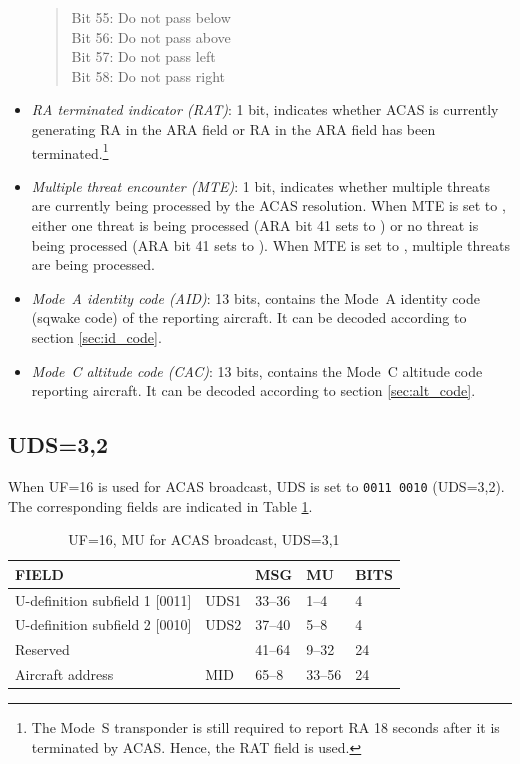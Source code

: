 \begin{itemize}
  \begin{quote}
    \small
    Bit 55: Do not pass below \\
    Bit 56: Do not pass above \\
    Bit 57: Do not pass left \\
    Bit 58: Do not pass right
  \end{quote}


  \item \emph{RA terminated indicator (RAT)}: 1 bit, indicates whether ACAS is currently generating RA in the ARA field or RA in the ARA field has been terminated.\footnote{The Mode~S transponder is still required to report RA 18 seconds after it is terminated by ACAS. Hence, the RAT field is used.}


  \item \emph{Multiple threat encounter (MTE)}: 1 bit, indicates whether multiple threats are currently being processed by the ACAS resolution. When MTE is set to \0, either one threat is being processed (ARA bit 41 sets to \1) or no threat is being processed (ARA bit 41 sets to \0). When MTE is set to \1, multiple threats are being processed.

  \item \emph{Mode~A identity code (AID)}: 13 bits, contains the Mode~A identity code (sqwake code) of the reporting aircraft. It can be decoded according to section \ref{sec:id_code}.

  \item \emph{Mode~C altitude code (CAC)}: 13 bits, contains the Mode~C altitude code reporting aircraft. It can be decoded according to section \ref{sec:alt_code}.


\end{itemize}



\subsection{UDS=3,2}

When UF=16 is used for ACAS broadcast, UDS is set to \texttt{0011 0010} (UDS=3,2). The corresponding fields are indicated in Table \ref{tb:acas_mu_uds32}.

\begin{table}[ht]
\caption{UF=16, MU for ACAS broadcast, UDS=3,1}
\label{tb:acas_mu_uds32}
\begin{tabular}{|l|l|l|l|l|}
\hline
\textbf{FIELD} & \textbf{} & \textbf{MSG} & \textbf{MU} & \textbf{BITS} \\ \hline
U-definition subfield 1 [0011] & UDS1 & 33--36 & 1--4 & 4 \\ \hline
U-definition subfield 2 [0010] & UDS2 & 37--40 & 5--8 & 4 \\ \hline
Reserved &  & 41--64 & 9--32 & 24 \\ \hline
Aircraft address & MID & 65--8 & 33--56 & 24 \\ \hline
\end{tabular}
\end{table}

